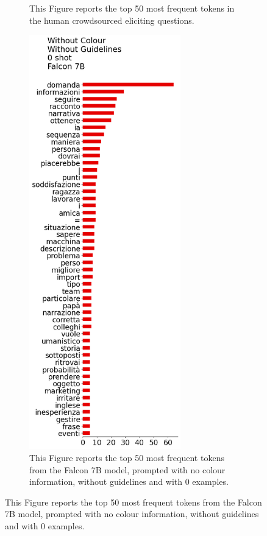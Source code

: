 \begin{figure}[!htbp]
\begin{subfigure}[t]{0.25\textwidth}
        \caption{This Figure reports the top 50 most frequent tokens in the human crowdsourced eliciting questions.}
        \label{sub:persona-narrative-elicitation-comparison-distribution-human}
    \end{subfigure}
    \hspace{-1.5cm}
    \begin{subfigure}[t]{0.45\textwidth}
        \centering
        \includegraphics[height=18cm]{assets/imgs/tokens-vertical/no_color/no_guidelines/0_shot/token_distribution_no_color_no_guidelines_0_shot_falcon-7b.png}
        \caption{This Figure reports the top 50 most frequent tokens from the Falcon 7B model, prompted with no colour information, without guidelines and with 0 examples.}

\end{subfigure}
\end{figure}
